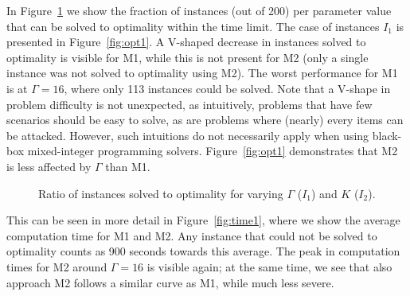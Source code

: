 In Figure~\ref{fig:opt} we show the fraction of instances (out of 200) per parameter value that can be solved to optimality within the time limit. The case of instances $I_1$ is presented in Figure~\ref{fig:opt1}. A V-shaped decrease in instances solved to optimality is visible for M1, while this is not present for M2 (only a single instance was not solved to optimality using M2). The worst performance for M1 is at $\Gamma=16$, where only 113 instances could be solved. 
Note that a V-shape in problem difficulty is not unexpected, as intuitively, problems that have few scenarios should be easy to solve, as are problems where (nearly) every items can be attacked. However, such intuitions do not necessarily apply when using black-box mixed-integer programming solvers.
Figure~\ref{fig:opt1} demonstrates that M2 is less affected by $\Gamma$ than M1. 

\begin{figure}[htb]
\begin{center}
%
\hfill
{}
\end{center}
\caption{Ratio of instances solved to optimality for varying $\Gamma$ ($I_1$) and $K$ ($I_2$).\label{fig:opt}}
\end{figure}

This can be seen in more detail in Figure~\ref{fig:time1}, where we show the average computation time for M1 and M2. Any instance that could not be solved to optimality counts as 900 seconds towards this average.
The peak in computation times for M2 around $\Gamma=16$ is visible again; at the same time, we see that also approach M2 follows a similar curve as M1, while much less severe.

